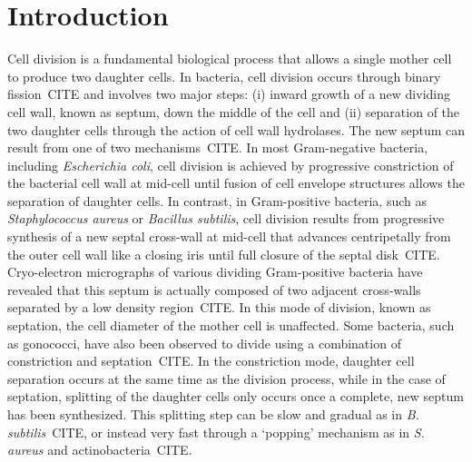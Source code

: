 \section{Introduction}
Cell division is a fundamental biological process that allows a single mother cell to produce two daughter cells.
In bacteria, cell division occurs through binary fission~CITE and involves two major steps: (i) inward growth of a new dividing cell wall, known as septum, down the middle of the cell and (ii) separation of the two daughter cells through the action of cell wall hydrolases.
The new septum can result from one of two mechanisms~CITE.
In most Gram-negative bacteria, including \emph{Escherichia coli}, cell division is achieved by progressive constriction of the bacterial cell wall at mid-cell until fusion of cell envelope structures allows the separation of daughter cells.
In contrast, in Gram-positive bacteria, such as \emph{Staphylococcus aureus} or \emph{Bacillus subtilis}, cell division results from progressive synthesis of a new septal cross-wall at mid-cell that advances centripetally from the outer cell wall like a closing iris until full closure of the septal disk~CITE.
Cryo-electron micrographs of various dividing Gram-positive bacteria have revealed that this septum is actually composed of two adjacent cross-walls separated by a low density region~CITE.
In this mode of division, known as septation, the cell diameter of the mother cell is unaffected.
Some bacteria, such as gonococci, have also been observed to divide using a combination of constriction and septation~CITE.
In the constriction mode, daughter cell separation occurs at the same time as the division process, while in the case of septation, splitting of the daughter cells only occurs once a complete, new septum has been synthesized.
This splitting step can be slow and gradual as in \emph{B.
subtilis}~CITE, or instead very fast through a `popping' mechanism as in \emph{S.
aureus} and actinobacteria~CITE.
